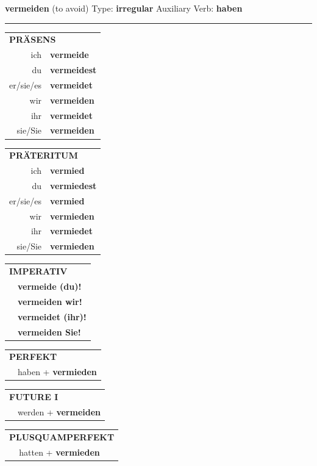 \documentclass[10pt,a4paper]{revtex4-2}
\begin{document}
\begin{verbbox}
{\Large \bf vermeiden} (to avoid) \hfill Type: \textbf{irregular} \hfill Auxiliary Verb: \textbf{haben}

\vspace{5pt}
\hrule
\vspace{5pt}

\begin{tabular}{rl}
\multicolumn{2}{l}{\textbf{PRÄSENS}}\\
ich & \textbf{vermeide}\\
du & \textbf{vermeidest}\\
er/sie/es & \textbf{vermeidet}\\
wir & \textbf{vermeiden}\\
ihr & \textbf{vermeidet}\\
sie/Sie & \textbf{vermeiden}\\
\end{tabular}
\hfill
\begin{tabular}{rl}
\multicolumn{2}{l}{\textbf{PRÄTERITUM}}\\
ich & \textbf{vermied}\\
du & \textbf{vermiedest}\\
er/sie/es & \textbf{vermied}\\
wir & \textbf{vermieden}\\
ihr & \textbf{vermiedet}\\
sie/Sie & \textbf{vermieden}\\
\end{tabular}
\hfill
\begin{tabular}{rl}
\multicolumn{2}{l}{\textbf{IMPERATIV}}\\
& \textbf{vermeide (du)!}\\
& \textbf{vermeiden wir!}\\
& \textbf{vermeidet (ihr)!}\\
& \textbf{vermeiden Sie!}\\
\end{tabular}

\vspace{10pt}

\begin{tabular}{rl}
\multicolumn{2}{l}{\textbf{PERFEKT}}\\
& haben + \textbf{vermieden}\\
\end{tabular}
\hfill
\begin{tabular}{rl}
\multicolumn{2}{l}{\textbf{FUTURE I}}\\
& werden + \textbf{vermeiden}\\
\end{tabular}
\hfill
\begin{tabular}{rl}
\multicolumn{2}{l}{\textbf{PLUSQUAMPERFEKT}}\\
& hatten + \textbf{vermieden}\\
\end{tabular}


\end{verbbox}
\end{document}
